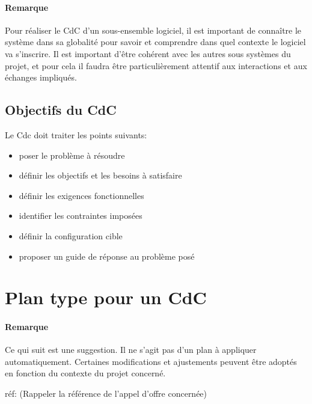 \documentclass[a4paper]{article}
\begin{document}
\paragraph{Remarque} Pour réaliser le CdC d'un sous-ensemble logiciel, il est important de connaître le système dans sa globalité pour savoir et comprendre dans quel contexte le logiciel va s'inscrire. Il est important d'être cohérent avec les autres sous systèmes du projet, et pour cela il faudra être particulièrement attentif aux interactions et aux échanges impliqués.

\subsection{Objectifs du CdC}

Le Cdc doit traiter les points suivants:

\begin{itemize}
\item poser le problème à résoudre
\item définir les objectifs et les besoins à satisfaire
\item définir les exigences fonctionnelles
\item identifier les contraintes imposées
\item définir la configuration cible
\item proposer un guide de réponse au problème posé
\end{itemize}

\section{Plan type pour un  CdC}

\paragraph{Remarque} Ce qui suit est une suggestion. Il ne s'agit pas d'un plan à appliquer automatiquement. Certaines modifications et ajustements peuvent être adoptés en fonction du contexte du projet concerné.

réf: (Rappeler la référence de l'appel d'offre concernée)
\end{document}
